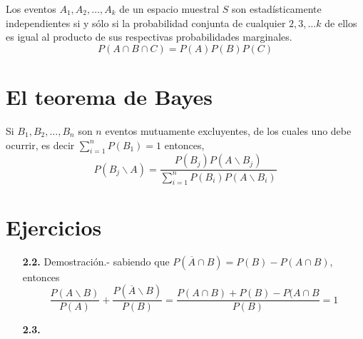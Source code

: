 \begin{tcolorbox}[colframe = white]
    \begin{def.} Los eventos $A_1,A_2,\ldots, A_k$ de un espacio muestral $S$ son estadísticamente independientes si y sólo si la probabilidad conjunta de cualquier $2,3,\ldots k$ de ellos es igual al producto de sus respectivas probabilidades marginales.
	$$P(A\cap B \cap C) = P(A)P(B)P(C)$$
    \end{def.}
\end{tcolorbox}

\section{El teorema de Bayes}

\begin{teo} Si $B_1,B_2,\ldots, B_n$ son $n$ eventos mutuamente excluyentes, de los cuales uno debe ocurrir, es decir $\sum_{i=1}^n P(B_1) = 1$ entonces,
    \begin{equation}
	P(B_j \backslash A) = \dfrac{P(B_j)P(A\backslash B_j)}{\sum\limits_{i=1}^n P(B_i)P(A\backslash B_i)}
    \end{equation}
\end{teo}
\vspace{1cm}

\section{Ejercicios}
\begin{enumerate}

    \item[\bfseries 2.2.] Demostración.-\; sabiendo que $P(\overline{A}\cap B) = P(B) - P(A\cap B)$, entonces 
	$$\dfrac{P(A\backslash B)}{P(A)}+\dfrac{P(\overline{A}\backslash B)}{P(B)} = \dfrac{P(A\cap B)+P(B)-P(A\cap B}{P(B)} = 1$$

    \item[\bfseries 2.3.]
\end{enumerate}
